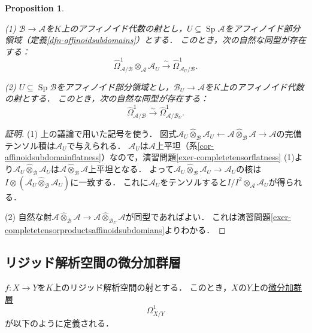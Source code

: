\documentclass[a4paper,12pt, dvipdfmx]{jsbook}
\def\Sp{\mathop{\mathrm{Sp}}\nolimits}
\theoremstyle{plain}
\newtheorem{prop}[thm]{\bfseries Proposition}
\theoremstyle{definition}
\begin{document}
\begin{prop}\label{prop-differentialmodule3}{\rm 
(1) $\mathcal{B}\rightarrow\mathcal{A}$を$K$上のアフィノイド代数の射とし，$U\subseteq\Sp\mathcal{A}$をアフィノイド部分領域（定義\ref{dfn-affinoidsubdomains}）とする．
このとき，次の自然な同型が存在する：
$$
\widehat{\Omega}^1_{\mathcal{A}/\mathcal{B}}\otimes_{\mathcal{A}}\mathcal{A}_U\stackrel{\sim}{\longrightarrow}\widehat{\Omega}^1_{\mathcal{A}_U/\mathcal{B}}.
$$

(2) $U\subseteq\Sp\mathcal{B}$をアフィノイド部分領域とし，$\mathcal{B}_U\rightarrow\mathcal{A}$を$K$上のアフィノイド代数の射とする．
このとき，次の自然な同型が存在する：
$$
\widehat{\Omega}^1_{\mathcal{A}/\mathcal{B}}\stackrel{\sim}{\longrightarrow}\widehat{\Omega}^1_{\mathcal{A}/\mathcal{B}_U}.
$$}
\end{prop}

\begin{proof}[証明]
(1) 上の議論で用いた記号を使う．
図式$\mathcal{A}_U\widehat{\otimes}_{\mathcal{B}}\mathcal{A}_U\leftarrow\mathcal{A}\widehat{\otimes}_{\mathcal{B}}\mathcal{A}\rightarrow\mathcal{A}$の完備テンソル積は$\mathcal{A}_U$で与えられる．
$\mathcal{A}_U$は$\mathcal{A}$上平坦（系\ref{cor-affinoidsubdomainflatness}）なので，演習問題\ref{exer-completetensorflatness} (1)より$\mathcal{A}_U\widehat{\otimes}_{\mathcal{B}}\mathcal{A}_U$は$\mathcal{A}\widehat{\otimes}_{\mathcal{B}}\mathcal{A}$上平坦となる．
よって$\mathcal{A}_U\widehat{\otimes}_{\mathcal{B}}\mathcal{A}_U\rightarrow\mathcal{A}_U$の核は$I\otimes(\mathcal{A}_U\widehat{\otimes}_{\mathcal{B}}\mathcal{A}_U)$に一致する．
これに$\mathcal{A}_U$をテンソルすると$I/I^2\otimes_{\mathcal{A}}\mathcal{A}_U$が得られる．

(2) 自然な射$\mathcal{A}\widehat{\otimes}_{\mathcal{B}}\mathcal{A}\rightarrow\mathcal{A}\widehat{\otimes}_{\mathcal{B}_U}\mathcal{A}$が同型であればよい．
これは演習問題\ref{exer-completetensorproductsaffinoidsubdomians}よりわかる．
\end{proof}

\subsection{リジッド解析空間の微分加群層}\label{sub-differentialsheaf}
$f\colon X\rightarrow Y$を$K$上のリジッド解析空間の射とする．
このとき，$X$の$Y$上の\underline{微分加群層}
$$
\Omega^1_{X/Y}
$$
が以下のように定義される．
\end{document}
